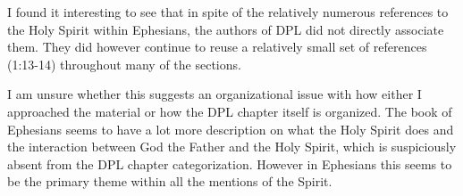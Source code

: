 \documentclass[12pt]{turabian-researchpaper}
\begin{document}
I found it interesting to see that in spite of the relatively numerous references to the Holy Spirit within Ephesians, the authors of DPL did not directly associate them. They did however continue to reuse a relatively small set of references (1:13-14) throughout many of the sections.

I am unsure whether this suggests an organizational issue with how either I approached the material or how the DPL chapter itself is organized. The book of Ephesians seems to have a lot more description on what the Holy Spirit does and the interaction between God the Father and the Holy Spirit, which is suspiciously absent from the DPL chapter categorization. However in Ephesians this seems to be the primary theme within all the mentions of the Spirit.

\newpage


\printbibliography
\end{document}
